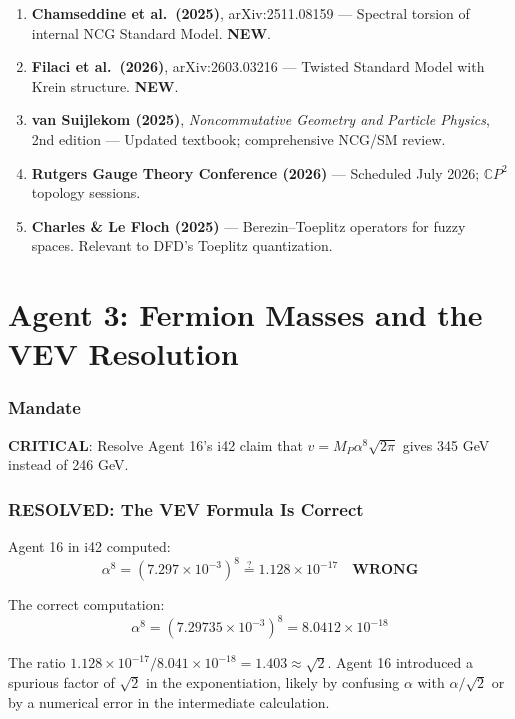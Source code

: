 \documentclass[11pt,a4paper]{article}
\newcommand{\NEW}{\textcolor{dfdblue}{\textbf{NEW}}}
\newcommand{\RESOLVED}{\textcolor{dfdgreen}{\textbf{RESOLVED}}}
\newcommand{\CP}{\mathbb{C}P}
\begin{document}
\begin{enumerate}
\item \textbf{Chamseddine et al.\ (2025)}, arXiv:2511.08159 --- Spectral torsion of internal NCG Standard Model. \NEW.
\item \textbf{Filaci et al.\ (2026)}, arXiv:2603.03216 --- Twisted Standard Model with Krein structure. \NEW.
\item \textbf{van Suijlekom (2025)}, \emph{Noncommutative Geometry and Particle Physics}, 2nd edition --- Updated textbook; comprehensive NCG/SM review.
\item \textbf{Rutgers Gauge Theory Conference (2026)} --- Scheduled July 2026; $\CP^2$ topology sessions.
\item \textbf{Charles \& Le Floch (2025)} --- Berezin--Toeplitz operators for fuzzy spaces. Relevant to DFD's Toeplitz quantization.
\end{enumerate}


\part{Agent 3: Fermion Masses and the VEV Resolution}
\label{part:agent3}

\section{Mandate}

\textbf{CRITICAL}: Resolve Agent 16's i42 claim that $v = M_P \alpha^8 \sqrt{2\pi}$ gives 345 GeV instead of 246 GeV.

\section{\RESOLVED: The VEV Formula Is Correct}
\label{part:agent16-resolution}

\begin{tcolorbox}[colback=green!5!white, colframe=green!60!black,
  title={RESOLUTION: Agent 16's i42 Flag Was a Computational Error}]

Agent 16 in i42 computed:
\begin{equation}
\alpha^8 = (7.297 \times 10^{-3})^8 \stackrel{?}{=} 1.128 \times 10^{-17} \quad \textbf{WRONG}
\end{equation}

The correct computation:
\begin{equation}
\alpha^8 = (7.29735 \times 10^{-3})^8 = 8.0412 \times 10^{-18}
\end{equation}

The ratio $1.128 \times 10^{-17} / 8.041 \times 10^{-18} = 1.403 \approx \sqrt{2}$. Agent 16 introduced a spurious factor of $\sqrt{2}$ in the exponentiation, likely by confusing $\alpha$ with $\alpha/\sqrt{2}$ or by a numerical error in the intermediate calculation.
\end{tcolorbox}
\end{document}
